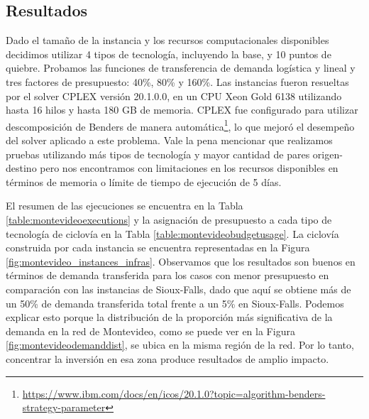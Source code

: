 \subsection{Resultados}

Dado el tamaño de la instancia y los recursos computacionales disponibles decidimos utilizar 4 tipos de tecnología, incluyendo la base, y 10 puntos de quiebre. Probamos las funciones de transferencia de demanda logística y lineal y tres factores de presupuesto: 40\%, 80\% y 160\%. Las instancias fueron resueltas por el solver CPLEX versión 20.1.0.0, en un CPU Xeon Gold 6138 utilizando hasta 16 hilos y hasta 180 GB de memoria. CPLEX fue configurado para utilizar descomposición de Benders de manera automática\footnote{\url{https://www.ibm.com/docs/en/icos/20.1.0?topic=algorithm-benders-strategy-parameter}}, lo que mejoró el desempeño del solver aplicado a este problema. Vale la pena mencionar que realizamos pruebas utilizando más tipos de tecnología y mayor cantidad de pares origen-destino pero nos encontramos con limitaciones en los recursos disponibles en términos de memoria o límite de tiempo de ejecución de 5 días.

El resumen de las ejecuciones se encuentra en la Tabla \ref{table:montevideoexecutions} y la asignación de presupuesto a cada tipo de tecnología de ciclovía en la Tabla \ref{table:montevideobudgetusage}. La ciclovía construida por cada instancia se encuentra representadas en la Figura \ref{fig:montevideo_instances_infras}. Observamos que los resultados son buenos en términos de demanda transferida para los casos con menor presupuesto en comparación con las instancias de Sioux-Falls, dado que aquí se obtiene más de un 50\% de demanda transferida total frente a un 5\% en Sioux-Falls. Podemos explicar esto porque la distribución de la proporción más significativa de la demanda en la red de Montevideo, como se puede ver en la Figura \ref{fig:montevideodemanddist}, se ubica en la misma región de la red. Por lo tanto, concentrar la inversión en esa zona produce resultados de amplio impacto.

